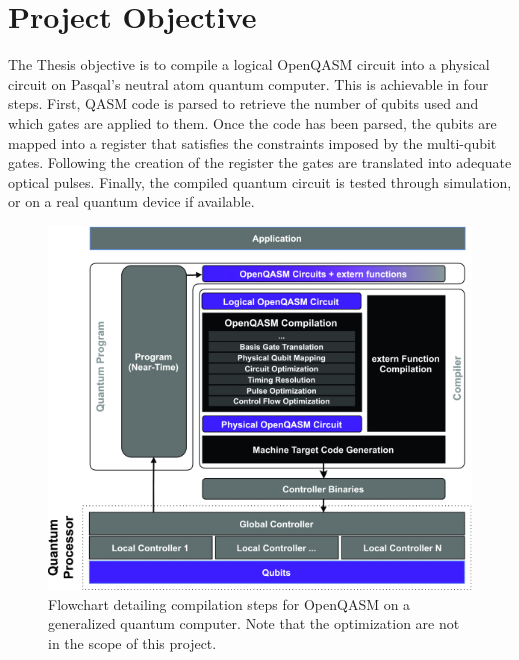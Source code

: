 \section{Project Objective}
\label{sec:objective}

The Thesis objective is to compile a logical OpenQASM circuit into a physical circuit on Pasqal's neutral atom quantum computer. 
This is achievable in four steps. First, QASM code is parsed to retrieve the number of qubits 
used and which gates are applied to them. Once the code has been parsed, the qubits are mapped into a register that satisfies the constraints imposed by the multi-qubit gates. Following the creation of the register 
the gates are translated into adequate optical pulses. 
Finally, the compiled quantum circuit is tested through simulation, or on a real quantum device if available.
\begin{figure}[H]
    \includegraphics[scale=16]{./Images/compilation_chart.jpg}
    \caption{Flowchart detailing compilation steps for OpenQASM on a generalized quantum computer. Note that the optimization are not in the scope of this project.\cite{crossOpenQASMBroaderDeeper2022}} 
    \label{fig:compchart}
  \end{figure}
